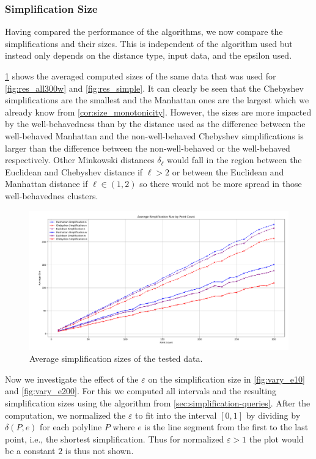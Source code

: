 \subsubsection{Simplification Size}
\label{ssubsec:simplification_size}
Having compared the performance of the algorithms, we now compare the simplifications and their sizes. This is independent of the algorithm used but instead only depends on the distance type, input data, and the epsilon used.

\cref{fig:simplification_sizes} shows the averaged computed sizes of the same data that was used for \cref{fig:res_all300w} and \cref{fig:res_simple}. It can clearly be seen that the Chebyshev simplifications are the smallest and the Manhattan ones are the largest which we already know from \cref{cor:size_monotonicity}. However, the sizes are more impacted by the well-behavedness than by the distance used as the difference between the well-behaved Manhattan and the non-well-behaved Chebyshev simplifications is larger than the difference between the non-well-behaved or the well-behaved respectively. Other Minkowski distances \(\delta_\ell\) would fall in the region between the Euclidean and Chebyshev distance if \(\ell > 2\) or between the Euclidean and Manhattan distance if \(\ell \in (1,2)\) so there would not be more spread in those well-behavednes clusters.

\begin{figure}[b]
  \centering
	\includegraphics[scale=0.4]{./figures/simplification_sizes.png}
  \caption{Average simplification sizes of the tested data.}
  \label{fig:simplification_sizes}
\end{figure}

Now we investigate the effect of the \(\varepsilon\) on the simplification size in \cref{fig:vary_e10} and \cref{fig:vary_e200}. For this we computed all intervals and the resulting simplification sizes using the algorithm from \cref{sec:simplification-queries}. After the computation, we normalized the \(\varepsilon\) to fit into the interval \([0, 1]\) by dividing by \(\delta(P, e)\) for each polyline \(P\) where \(e\) is the line segment from the first to the last point, i.e., the shortest simplification. Thus for normalized \(\varepsilon > 1\) the plot would be a constant \(2\) is thus not shown. 

